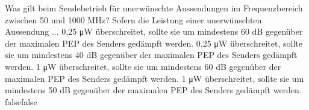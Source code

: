     {Was gilt beim Sendebetrieb für unerwünschte Aussendungen im Frequenzbereich zwischen 50 und 1000 MHz? Sofern die Leistung einer unerwünschten Aussendung ...}
    {0,25 \si{\micro\watt} überschreitet, sollte sie um mindestens 60 dB gegenüber der maximalen PEP des Senders gedämpft werden.}
    {0,25 \si{\micro\watt} überschreitet, sollte sie um mindestens 40 dB gegenüber der maximalen PEP des Senders gedämpft werden.}
    {1 \si{\micro\watt} überschreitet, sollte sie um mindestens 60 dB gegenüber der maximalen PEP des Senders gedämpft werden.}
    {1 \si{\micro\watt} überschreitet, sollte sie um mindestens 50 dB gegenüber der maximalen PEP des Senders gedämpft werden.}
    {false}{false}